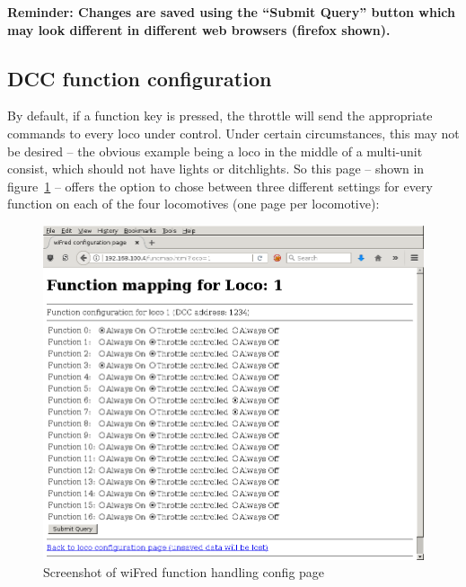 \documentclass[11pt,a4paper]{scrartcl}
\begin{document}
\textbf{Reminder: Changes are saved using the ``Submit Query'' button which may look different in different web browsers (firefox shown).}

\subsection{DCC function configuration} \label{throttle_FunctionConf}

By default, if a function key is pressed, the throttle will send the appropriate commands to every loco under control. Under certain circumstances, this may not be desired -- the obvious example being a loco in the middle of a multi-unit consist, which should not have lights or ditchlights. So this page -- shown in figure~\ref{throttleConfigFunctionPage} -- offers the option to chose between three different settings for every function on each of the four locomotives (one page per locomotive):

\begin{figure}[tbh]
  \centering
  \includegraphics[width=0.8 \textwidth]{images/screenShot_functions}
  \caption{Screenshot of wiFred function handling config page}
  \label{throttleConfigFunctionPage}
\end{figure}
\end{document}

